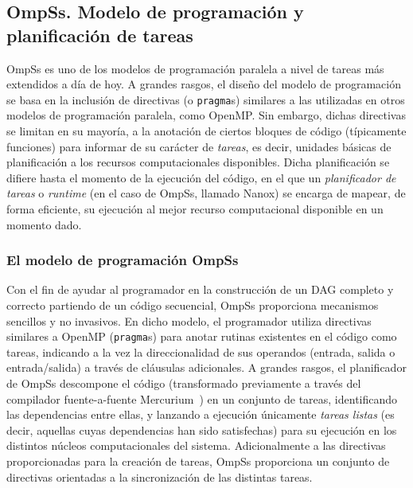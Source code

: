 %
%
%
%

\subsection{OmpSs. Modelo de programación y planificación de tareas}

OmpSs es uno de los modelos de programación paralela a nivel de tareas más
extendidos a día de hoy. A grandes rasgos, el diseño del modelo de
programación se basa en la inclusión de directivas (o {\tt pragma}s)
similares a las utilizadas en otros modelos de programación paralela, como
OpenMP. Sin embargo, dichas directivas se limitan en su mayoría, a la
anotación de ciertos bloques de código (típicamente funciones) para
informar de su carácter de {\em tareas}, es decir, unidades básicas de
planificación a los recursos computacionales disponibles. Dicha
planificación se difiere hasta el momento de la ejecución del código, en el
que un {\em planificador de tareas} o {\em runtime} (en el caso de OmpSs,
llamado Nanox) se encarga de mapear, de forma eficiente, su ejecución al
mejor recurso computacional disponible en un momento dado.

\subsubsection{El modelo de programación OmpSs}

Con el fin de ayudar al programador en la construcción de un DAG completo y
correcto partiendo de un código secuencial, OmpSs proporciona mecanismos
sencillos y no invasivos. En dicho modelo, el programador utiliza
directivas similares a OpenMP ({\tt pragma}s) para anotar rutinas
existentes en el código como tareas, indicando a la vez la direccionalidad
de sus operandos (entrada, salida o entrada/salida) a través de cláusulas
adicionales. A grandes rasgos, el planificador de OmpSs descompone el
código (transformado previamente a través del compilador fuente-a-fuente
Mercurium~\cite{Mercurium}) en un conjunto de tareas, identificando las
dependencias entre ellas, y lanzando a ejecución únicamente {\em tareas
  listas} (es decir, aquellas cuyas dependencias han sido satisfechas) para
su ejecución en los distintos núcleos computacionales del
sistema. Adicionalmente a las directivas proporcionadas para la creación de
tareas, OmpSs proporciona un conjunto de directivas orientadas a la
sincronización de las distintas tareas.

